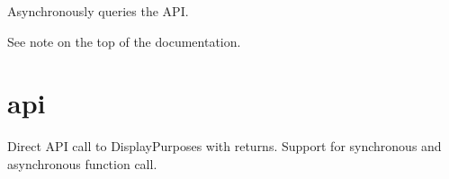 \documentclass[letterpaper,10pt,english,openany,oneside]{sphinxmanual}
\begin{document}
\begin{fulllineitems}
\begin{fulllineitems}
\begin{fulllineitems}
\end{fulllineitems}


\end{fulllineitems}


\begin{fulllineitems}
\label{\detokenize{source/wrapper/maps:instahashtag.wrapper.Maps.Maps.call}}
Asynchronously queries the API.

See note on the top of the {\hyperref[\detokenize{source/wrapper:wrapper}]{}} documentation.

\end{fulllineitems}


\end{fulllineitems}



\chapter{api}
\label{\detokenize{source/api:api}}\label{\detokenize{source/api::doc}}
\begin{sphinxVerbatim}[commandchars=\\\{\}]
   
\end{sphinxVerbatim}

Direct API call to DisplayPurposes with  returns. Support for synchronous and asynchronous
function call.
\end{document}
